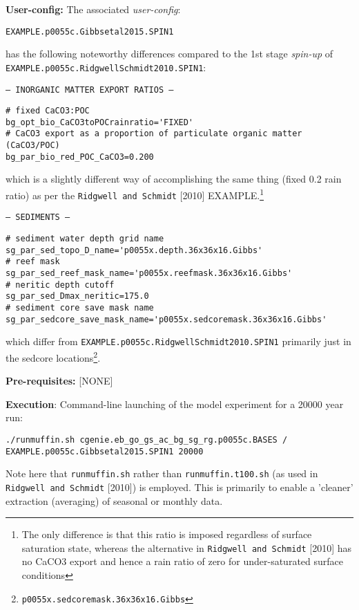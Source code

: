 \documentclass[10pt,twoside]{article}
\begin{document}
\noindent \textbf{User-config:} The associated \textit{user-config}:
\vspace{-10pt}\begin{verbatim}EXAMPLE.p0055c.Gibbsetal2015.SPIN1\end{verbatim}\vspace{-10pt}
has the following noteworthy differences compared to the 1st stage \textit{spin-up} of 
\\\texttt{EXAMPLE.p0055c.RidgwellSchmidt2010.SPIN1}:

\begin{compactitem}
                \item \texttt{--- INORGANIC MATTER EXPORT RATIOS ---}
                \vspace{-5pt}\begin{verbatim}
# fixed CaCO3:POC
bg_opt_bio_CaCO3toPOCrainratio='FIXED'
# CaCO3 export as a proportion of particulate organic matter (CaCO3/POC)
bg_par_bio_red_POC_CaCO3=0.200
                \end{verbatim}\vspace{-5pt}
which is a slightly different way of accomplishing the same thing (fixed 0.2 rain ratio) as per the \texttt{Ridgwell and Schmidt} [2010] EXAMPLE.\footnote{The only difference is that this ratio is imposed regardless of surface saturation state, whereas the alternative in \texttt{Ridgwell and Schmidt} [2010] has no CaCO3 export and hence a rain ratio of zero for under-saturated surface conditions}
                \item \texttt{--- SEDIMENTS ---}
                \vspace{-5pt}\begin{verbatim}
# sediment water depth grid name
sg_par_sed_topo_D_name='p0055x.depth.36x36x16.Gibbs'
# reef mask
sg_par_sed_reef_mask_name='p0055x.reefmask.36x36x16.Gibbs'
# neritic depth cutoff
sg_par_sed_Dmax_neritic=175.0
# sediment core save mask name
sg_par_sedcore_save_mask_name='p0055x.sedcoremask.36x36x16.Gibbs'
                \end{verbatim}\vspace{-5pt}
                which differ from \texttt{EXAMPLE.p0055c.RidgwellSchmidt2010.SPIN1} primarily just in the sedcore locations\footnote{\texttt{p0055x.sedcoremask.36x36x16.Gibbs}}.
        \end{compactitem}

\noindent \textbf{Pre-requisites:} [NONE]

\noindent \textbf{Execution}: Command-line launching of the model experiment for a 20000 year run:
\vspace{-10pt}\small\begin{verbatim}
./runmuffin.sh cgenie.eb_go_gs_ac_bg_sg_rg.p0055c.BASES / 
EXAMPLE.p0055c.Gibbsetal2015.SPIN1 20000 
\end{verbatim}\normalsize\vspace{-10pt}
Note here that \texttt{runmuffin.sh} rather than \texttt{runmuffin.t100.sh} (as used in \texttt{Ridgwell and Schmidt} [2010]) is employed. This is primarily to enable a 'cleaner' extraction (averaging) of seasonal or monthly data.
\end{document}
